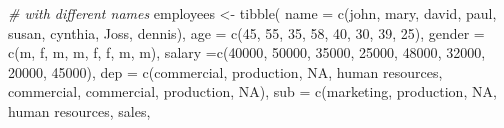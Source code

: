 \documentclass[
]{book}
\newenvironment{Shaded}{\begin{snugshade}}{\end{snugshade}}
\newcommand{\AttributeTok}[1]{\textcolor[rgb]{0.77,0.63,0.00}{#1}}
\newcommand{\CommentTok}[1]{\textcolor[rgb]{0.56,0.35,0.01}{\textit{#1}}}
\newcommand{\ConstantTok}[1]{\textcolor[rgb]{0.00,0.00,0.00}{#1}}
\newcommand{\DecValTok}[1]{\textcolor[rgb]{0.00,0.00,0.81}{#1}}
\newcommand{\FunctionTok}[1]{\textcolor[rgb]{0.00,0.00,0.00}{#1}}
\newcommand{\NormalTok}[1]{#1}
\newcommand{\OtherTok}[1]{\textcolor[rgb]{0.56,0.35,0.01}{#1}}
\newcommand{\StringTok}[1]{\textcolor[rgb]{0.31,0.60,0.02}{#1}}
\begin{document}
\begin{Shaded}
\begin{Highlighting}[]
\CommentTok{\# with different names}
\NormalTok{employees }\OtherTok{\textless{}{-}} \FunctionTok{tibble}\NormalTok{(}
    \AttributeTok{name =} \FunctionTok{c}\NormalTok{(}\StringTok{\textquotesingle{}john\textquotesingle{}}\NormalTok{, }\StringTok{\textquotesingle{}mary\textquotesingle{}}\NormalTok{, }\StringTok{\textquotesingle{}david\textquotesingle{}}\NormalTok{, }\StringTok{\textquotesingle{}paul\textquotesingle{}}\NormalTok{, }\StringTok{\textquotesingle{}susan\textquotesingle{}}\NormalTok{, }\StringTok{\textquotesingle{}cynthia\textquotesingle{}}\NormalTok{, }\StringTok{\textquotesingle{}Joss\textquotesingle{}}\NormalTok{, }\StringTok{\textquotesingle{}dennis\textquotesingle{}}\NormalTok{),}
    \AttributeTok{age =} \FunctionTok{c}\NormalTok{(}\DecValTok{45}\NormalTok{, }\DecValTok{55}\NormalTok{, }\DecValTok{35}\NormalTok{, }\DecValTok{58}\NormalTok{, }\DecValTok{40}\NormalTok{, }\DecValTok{30}\NormalTok{, }\DecValTok{39}\NormalTok{, }\DecValTok{25}\NormalTok{),}
    \AttributeTok{gender =} \FunctionTok{c}\NormalTok{(}\StringTok{\textquotesingle{}m\textquotesingle{}}\NormalTok{, }\StringTok{\textquotesingle{}f\textquotesingle{}}\NormalTok{, }\StringTok{\textquotesingle{}m\textquotesingle{}}\NormalTok{, }\StringTok{\textquotesingle{}m\textquotesingle{}}\NormalTok{, }\StringTok{\textquotesingle{}f\textquotesingle{}}\NormalTok{, }\StringTok{\textquotesingle{}f\textquotesingle{}}\NormalTok{, }\StringTok{\textquotesingle{}m\textquotesingle{}}\NormalTok{, }\StringTok{\textquotesingle{}m\textquotesingle{}}\NormalTok{),}
    \AttributeTok{salary =}\FunctionTok{c}\NormalTok{(}\DecValTok{40000}\NormalTok{, }\DecValTok{50000}\NormalTok{, }\DecValTok{35000}\NormalTok{, }\DecValTok{25000}\NormalTok{, }\DecValTok{48000}\NormalTok{, }\DecValTok{32000}\NormalTok{, }\DecValTok{20000}\NormalTok{, }\DecValTok{45000}\NormalTok{),}
    \AttributeTok{dep =} \FunctionTok{c}\NormalTok{(}\StringTok{\textquotesingle{}commercial\textquotesingle{}}\NormalTok{, }\StringTok{\textquotesingle{}production\textquotesingle{}}\NormalTok{, }\ConstantTok{NA}\NormalTok{, }\StringTok{\textquotesingle{}human resources\textquotesingle{}}\NormalTok{, }\StringTok{\textquotesingle{}commercial\textquotesingle{}}\NormalTok{, }
            \StringTok{\textquotesingle{}commercial\textquotesingle{}}\NormalTok{, }\StringTok{\textquotesingle{}production\textquotesingle{}}\NormalTok{, }\ConstantTok{NA}\NormalTok{),}
    \AttributeTok{sub =} \FunctionTok{c}\NormalTok{(}\StringTok{\textquotesingle{}marketing\textquotesingle{}}\NormalTok{, }\StringTok{\textquotesingle{}production\textquotesingle{}}\NormalTok{, }\ConstantTok{NA}\NormalTok{, }\StringTok{\textquotesingle{}human resources\textquotesingle{}}\NormalTok{, }\StringTok{\textquotesingle{}sales\textquotesingle{}}\NormalTok{, }

\end{Highlighting}
\end{Shaded}
\end{document}

